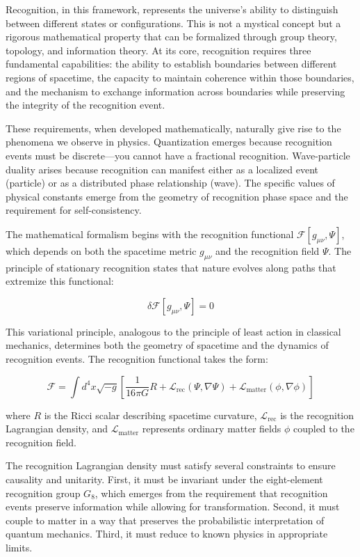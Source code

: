 \documentclass[12pt,a4paper]{report}
\begin{document}
Recognition, in this framework, represents the universe's ability to distinguish between different states or configurations. This is not a mystical concept but a rigorous mathematical property that can be formalized through group theory, topology, and information theory. At its core, recognition requires three fundamental capabilities: the ability to establish boundaries between different regions of spacetime, the capacity to maintain coherence within those boundaries, and the mechanism to exchange information across boundaries while preserving the integrity of the recognition event.

These requirements, when developed mathematically, naturally give rise to the phenomena we observe in physics. Quantization emerges because recognition events must be discrete—you cannot have a fractional recognition. Wave-particle duality arises because recognition can manifest either as a localized event (particle) or as a distributed phase relationship (wave). The specific values of physical constants emerge from the geometry of recognition phase space and the requirement for self-consistency.

The mathematical formalism begins with the recognition functional $\mathcal{F}[g_{\mu\nu}, \Psi]$, which depends on both the spacetime metric $g_{\mu\nu}$ and the recognition field $\Psi$. The principle of stationary recognition states that nature evolves along paths that extremize this functional:

\begin{equation}
\delta \mathcal{F}[g_{\mu\nu}, \Psi] = 0
\end{equation}

This variational principle, analogous to the principle of least action in classical mechanics, determines both the geometry of spacetime and the dynamics of recognition events. The recognition functional takes the form:

\begin{equation}
\mathcal{F} = \int d^4x \sqrt{-g} \left[ \frac{1}{16\pi G} R + \mathcal{L}_{\text{rec}}(\Psi, \nabla\Psi) + \mathcal{L}_{\text{matter}}(\phi, \nabla\phi) \right]
\end{equation}

where $R$ is the Ricci scalar describing spacetime curvature, $\mathcal{L}_{\text{rec}}$ is the recognition Lagrangian density, and $\mathcal{L}_{\text{matter}}$ represents ordinary matter fields $\phi$ coupled to the recognition field.

The recognition Lagrangian density must satisfy several constraints to ensure causality and unitarity. First, it must be invariant under the eight-element recognition group $G_8$, which emerges from the requirement that recognition events preserve information while allowing for transformation. Second, it must couple to matter in a way that preserves the probabilistic interpretation of quantum mechanics. Third, it must reduce to known physics in appropriate limits.
\end{document}
